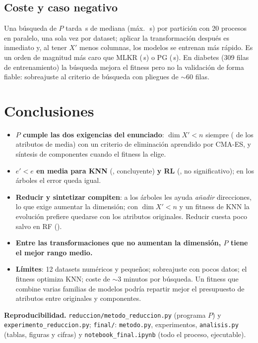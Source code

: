 \documentclass[memoria,twocolumn]{uc3mmaster}
\begin{document}
\subsection{Coste y caso negativo}
Una búsqueda de $P$ tarda \segMediana\,s de mediana (máx.\ \segMax\,s) por partición con 20 procesos en paralelo, una
sola vez por dataset; aplicar la transformación después es inmediato y, al tener $X'$ menos columnas, los modelos se
entrenan más rápido. Es un orden de magnitud más caro que MLKR (\segMLKR\,s) o PG (\segPG\,s). En diabetes (309 filas
de entrenamiento) la búsqueda mejora el fitness pero no la validación de forma fiable: sobreajuste al criterio de
búsqueda con pliegues de $\sim$60 filas.

\section{Conclusiones}
\begin{itemize}
\item \textbf{$P$ cumple las dos exigencias del enunciado}: $\dim X'<n$ siempre (\dimMedia{} de los atributos de
media) con un criterio de eliminación aprendido por CMA-ES, y síntesis de componentes cuando el fitness la elige.
\item \textbf{$e'<e$ en media para KNN} (\cambioKNN, concluyente) \textbf{y RL} (\cambioRL, no significativo); en los
árboles el error queda igual.
\item \textbf{Reducir y sintetizar compiten}: a los árboles les ayuda \emph{añadir} direcciones, lo que exige
aumentar la dimensión; con $\dim X'<n$ y un fitness de KNN la evolución prefiere quedarse con los atributos
originales. Reducir cuesta poco salvo en RF (\cambioRedRF).
\item \textbf{Entre las transformaciones que no aumentan la dimensión, $P$ tiene el mejor rango medio.}
\item \textbf{Límites}: 12 datasets numéricos y pequeños; sobreajuste con pocos datos; el fitness optimiza KNN; coste
de $\sim$3 minutos por búsqueda. Un fitness que combine varias familias de modelos podría repartir mejor el
presupuesto de atributos entre originales y componentes.
\end{itemize}

{\footnotesize\textbf{Reproducibilidad.} \texttt{reduccion/metodo\_reduccion.py} (programa $P$) y
\texttt{experimento\_reduccion.py}; \texttt{final/}: \texttt{metodo.py}, experimentos, \texttt{analisis.py} (tablas,
figuras y cifras) y \texttt{notebook\_final.ipynb} (todo el proceso, ejecutable).\par}
\end{document}
